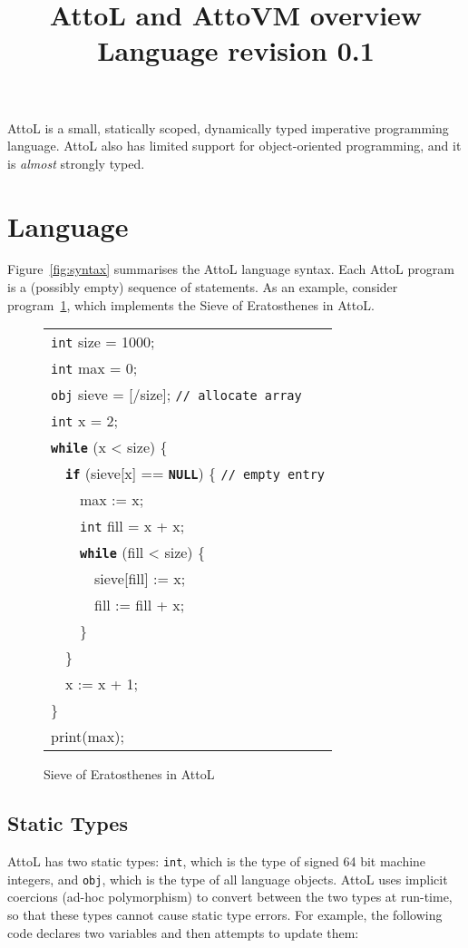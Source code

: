 \documentclass[11pt,a4paper]{article}
\title{AttoL and AttoVM overview\\ \small{Language revision 0.1}}
\newenvironment{slisting}{%
        \begin{tt}%
        \begin{tabular}{l}%
        }
        {%
        \end{tabular}%
        \end{tt}%
        }
\newcommand{\Cty}[1]{\textcolor{dblue}{\texttt{#1}}}
\newcommand{\Ccom}[1]{\textcolor{dgreen}{\texttt{#1}}}
\newcommand{\Ckw}[1]{\textbf{\texttt{#1}}}
\begin{document}
\maketitle

AttoL is a small, statically scoped, dynamically typed imperative
programming language.  AttoL also has limited support for
object-oriented programming, and it is \emph{almost} strongly typed.

\section{Language}

Figure~\ref{fig:syntax} summarises the AttoL language syntax.  Each
AttoL program is a (possibly empty) sequence of statements.  As an
example, consider program~\ref{fig:sieve}, which implements the Sieve
of Eratosthenes in AttoL.

\begin{figure}
\begin{slisting}
\Cty{int} size = 1000;\\
\Cty{int} max = 0;\\
\Cty{obj} sieve = [/size]; \Ccom{// allocate array}\\
\Cty{int} x = 2; \\
\Ckw{while} (x < size) \{ \\
\ \     \Ckw{if} (sieve[x] == \Ckw{NULL}) \{ \Ccom{// empty entry}\\
\ \ \ \        max := x; \\
\ \ \ \	\Cty{int} fill = x + x;\\
\ \ \ \         \Ckw{while} (fill < size) \{\\
\ \ \ \ \ \             sieve[fill] := x;\\
\ \ \ \ \ \             fill := fill + x;\\
\ \ \ \         \}\\
\ \     \}\\
\ \     x := x + 1;\\
\}\\
print(max);
\end{slisting}
\caption{Sieve of Eratosthenes in AttoL}\label{fig:sieve}
\end{figure}

\subsection{Static Types}\label{sec:types}
AttoL has two static types: \Cty{int}, which is the type of signed 64 bit
machine integers, and \Cty{obj}, which is the type of all language objects.
AttoL uses implicit coercions (ad-hoc polymorphism) to convert between
the two types at run-time, so that these types cannot cause static type errors.
For example, the following code declares
two variables and then attempts to update them:
\end{document}
